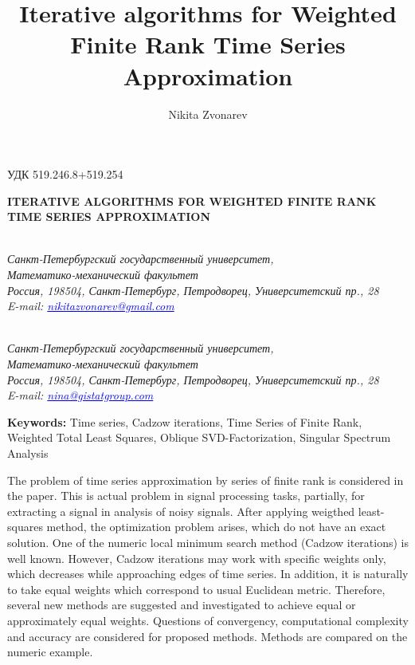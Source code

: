 \documentclass[12pt,a4paper,fleqn,leqno]{article}
\author{Nikita Zvonarev}
\title{Iterative algorithms for Weighted Finite Rank Time Series  Approximation}
\begin{document}
\noindent УДК 519.246.8+519.254

\begin{center}{
\fontsize{18pt}{23pt}\selectfont\bf%
  \MakeUppercase{
 Iterative algorithms for Weighted Finite Rank Time Series Approximation
}}
\end{center}

\begin{center}{\bpv{}\\
\footnotesize\it Санкт-Петербургский государственный университет,\\
Математико-механический факультет
\\
\rm
Россия, 198504, Санкт-Петербург, Петродворец, Университетский пр., 28\\
E-mail: \textcolor {blue}{\underline{nikitazvonarev@gmail.com}}}
\end{center}
\begin{center}{\\
\footnotesize\it Санкт-Петербургский государственный университет,\\
Математико-механический факультет
\\
\rm
Россия, 198504, Санкт-Петербург, Петродворец, Университетский пр., 28\\
E-mail: \textcolor {blue}{\underline{nina@gistatgroup.com}}}
\end{center}
\hspace{1.25cm}\begin{minipage}{12.16cm}\bpv\bpv\bmv \noindent
\footnotesize{\bf Keywords:}\/ Time series, Cadzow iterations, Time Series of Finite Rank, Weighted Total Least Squares, Oblique SVD-Factorization, Singular Spectrum Analysis

\bpv\bpv\noindent  The problem of time series approximation by series of finite rank is considered in the paper. This is actual problem in signal processing tasks, partially, for extracting a signal in analysis of noisy signals. After applying weigthed least-squares method, the optimization problem arises, which do not have an exact solution. One of the numeric local minimum search method (Cadzow iterations) is well known. However, Cadzow iterations may work with specific weights only, which decreases while approaching edges of time series. In addition, it is naturally to take equal weights which correspond to usual Euclidean metric. Therefore, several new methods are suggested and investigated to achieve equal or approximately equal weights. Questions of convergency, computational complexity and accuracy are considered for proposed methods. Methods are compared on the numeric example.

\end{minipage}\bls\bmv
\end{document}

